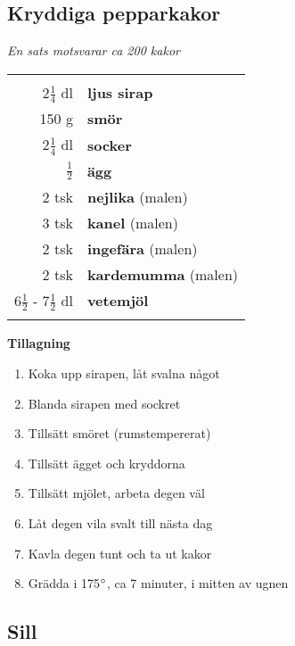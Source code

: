 \documentclass[a4paper,12pt]{article}
\newcommand{\sats}[1]{\noindent \textit{En sats motsvarar #1}}
\begin{document}
\clearpage

\subsection{Kryddiga pepparkakor}
\sats{ca 200 kakor}

\begin{table}[H]
	\begin{tabular}{rl}
	\hline
	&\\
		2$\frac{1}{4}$ dl & \textbf{ljus sirap} \\
		150 g & \textbf{smör} \\
		2$\frac{1}{4}$ dl & \textbf{socker} \\
		$\frac{1}{2}$ & \textbf{ägg} \\
		2 tsk & \textbf{nejlika} (malen) \\
		3 tsk & \textbf{kanel} (malen) \\
		2 tsk & \textbf{ingefära} (malen) \\
		2 tsk & \textbf{kardemumma} (malen) \\
		6$\frac{1}{2}$ - 7$\frac{1}{2}$ dl & \textbf{vetemjöl} \\
	&\\
	\hline
	\end{tabular}
\end{table}

\begin{multicols*}{2}

\noindent \textbf{Tillagning}
\begin{enumerate}
	\itemsep0cm
	\item Koka upp sirapen, låt svalna något
	\item Blanda sirapen med sockret
	\item Tillsätt smöret (rumstempererat)
	\item Tillsätt ägget och kryddorna
	\item Tillsätt mjölet, arbeta degen väl
	\item Låt degen vila svalt till nästa dag
	\item Kavla degen tunt och ta ut kakor
	\item Grädda i 175$\degree$, ca 7 minuter, i mitten av ugnen
\end{enumerate}

\end{multicols*}

\clearpage

\subsection{Sill}
\clearpage
\end{document}
